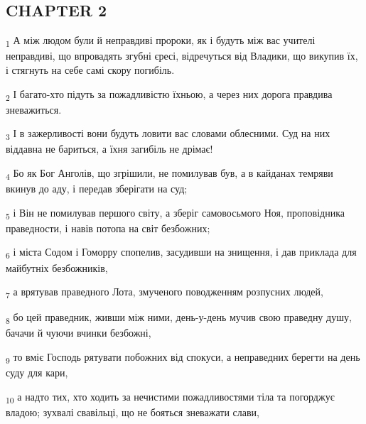 \subsection{CHAPTER 2}
\begin{tcolorbox}
\textsubscript{1} А між людом були й неправдиві пророки, як і будуть між вас учителі неправдиві, що впровадять згубні єресі, відречуться від Владики, що викупив їх, і стягнуть на себе самі скору погибіль.
\end{tcolorbox}
\begin{tcolorbox}
\textsubscript{2} І багато-хто підуть за пожадливістю їхньою, а через них дорога правдива зневажиться.
\end{tcolorbox}
\begin{tcolorbox}
\textsubscript{3} І в зажерливості вони будуть ловити вас словами облесними. Суд на них віддавна не бариться, а їхня загибіль не дрімає!
\end{tcolorbox}
\begin{tcolorbox}
\textsubscript{4} Бо як Бог Анголів, що згрішили, не помилував був, а в кайданах темряви вкинув до аду, і передав зберігати на суд;
\end{tcolorbox}
\begin{tcolorbox}
\textsubscript{5} і Він не помилував першого світу, а зберіг самовосьмого Ноя, проповідника праведности, і навів потопа на світ безбожних;
\end{tcolorbox}
\begin{tcolorbox}
\textsubscript{6} і міста Содом і Гоморру спопелив, засудивши на знищення, і дав приклада для майбутніх безбожників,
\end{tcolorbox}
\begin{tcolorbox}
\textsubscript{7} а врятував праведного Лота, змученого поводженням розпусних людей,
\end{tcolorbox}
\begin{tcolorbox}
\textsubscript{8} бо цей праведник, живши між ними, день-у-день мучив свою праведну душу, бачачи й чуючи вчинки безбожні,
\end{tcolorbox}
\begin{tcolorbox}
\textsubscript{9} то вміє Господь рятувати побожних від спокуси, а неправедних берегти на день суду для кари,
\end{tcolorbox}
\begin{tcolorbox}
\textsubscript{10} а надто тих, хто ходить за нечистими пожадливостями тіла та погорджує владою; зухвалі свавільці, що не бояться зневажати слави,
\end{tcolorbox}
